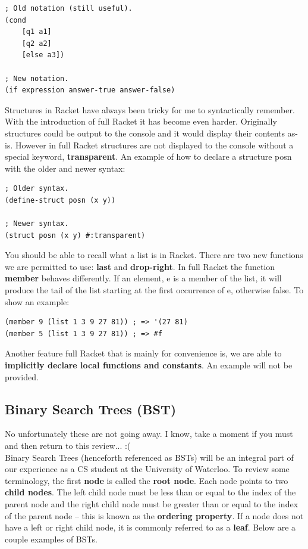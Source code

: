 \documentclass[12pt,extarticle]{article}
\begin{document}
\lstset {
	language=Lisp
}
\begin{lstlisting}
; Old notation (still useful).
(cond
	[q1 a1]
	[q2 a2]
	[else a3])

; New notation.
(if expression answer-true answer-false)
\end{lstlisting}

Structures in Racket have always been tricky for me to syntactically remember. With the introduction of full Racket it has become even harder. Originally structures could be output to the console and it would display their contents as-is. However in full Racket structures are not displayed to the console without a special keyword, \textbf{transparent}. An example of how to declare a structure posn with the older and newer syntax:\\

\lstset {
	language=Lisp
}
\begin{lstlisting}
; Older syntax.
(define-struct posn (x y))

; Newer syntax.
(struct posn (x y) #:transparent)
\end{lstlisting}

You should be able to recall what a list is in Racket. There are two new functions we are permitted to use: \textbf{last} and \textbf{drop-right}. In full Racket the function \textbf{member} behaves differently. If an element, e is a member of the list, it will produce the tail of the list starting at the first occurrence of e, otherwise false. To show an example:\\

\lstset {
	language=Lisp
}
\begin{lstlisting}
(member 9 (list 1 3 9 27 81)) ; => '(27 81)
(member 5 (list 1 3 9 27 81)) ; => #f
\end{lstlisting}

Another feature full Racket that is mainly for convenience is, we are able to \textbf{implicitly declare local functions and constants}. An example will not be provided.

\subsection{Binary Search Trees (BST)}

No unfortunately these are not going away. I know, take a moment if you must and then return to this review... :(\\

Binary Search Trees (henceforth referenced as BSTs) will be an integral part of our experience as a CS student at the University of Waterloo. To review some terminology, the first \textbf{node} is called the \textbf{root node}. Each node points to two \textbf{child nodes}. The left child node must be less than or equal to the index of the parent node and the right child node must be greater than or equal to the index of the parent node -- this is known as the \textbf{ordering property}. If a node does not have a left or right child node, it is commonly referred to as a \textbf{leaf}. Below are a couple examples of BSTs.\\
\end{document}
